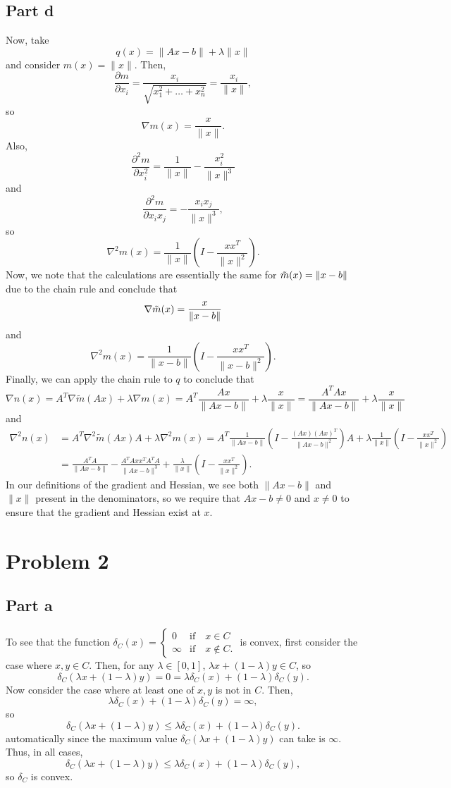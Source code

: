 \documentclass{article}
\begin{document}
\subsection{Part d}
Now, take 
\[
q(x)=\|Ax-b\| + \lambda \|x\|
\]
and consider $m(x)=\|x\|$. Then,
\[
\frac{\partial m}{\partial x_i}=\frac{x_i}{\sqrt{x_1^2+\ldots+x_n^2}}=\frac{x_i}{\|x\|},
\]
so 
\[
\nabla m(x)=\frac{x}{\|x\|}. 
\]
Also,
\[
\frac{\partial^2 m}{\partial x_i^2}=\frac{1}{\|x\|}-\frac{x_i^2}{\|x\|^3}
\]
and
\[
\frac{\partial^2 m}{\partial x_ix_j}=-\frac{x_ix_j}{\|x\|^3},
\]
so 
\[
\nabla^2m(x)=\frac{1}{\|x\|}\left(I-\frac{xx^T}{\|x\|^2}\right).
\]
Now, we note that the calculations are essentially the same for $\Tilde{m}(x)=\|x-b\|$ due to the chain rule and conclude that 
\[
\nabla \Tilde{m}(x)=\frac{x}{\|x-b\|}
\]
and 
\[
\nabla^2m(x)=\frac{1}{\|x-b\|}\left(I-\frac{xx^T}{\|x-b\|^2}\right).
\]
Finally, we can apply the chain rule to $q$ to conclude that
\[
\nabla n(x)=A^T\nabla\tilde{m}(Ax)+\lambda\nabla m(x)=A^T\frac{Ax}{\|Ax-b\|}+\lambda\frac{x}{\|x\|}=\frac{A^TAx}{\|Ax-b\|}+\lambda\frac{x}{\|x\|}
\]
and 
\begin{align*}
\nabla^2 n(x)&=A^T\nabla^2\tilde{m}(Ax)A+\lambda\nabla^2 m(x)=A^T\frac{1}{\|Ax-b\|}\left(I-\frac{(Ax)(Ax)^T}{\|Ax-b\|^2}\right)A+\lambda\frac{1}{\|x\|}\left(I-\frac{xx^T}{\|x\|^2}\right)\\&=
\frac{A^TA}{\|Ax-b\|}-\frac{A^TAxx^TA^TA}{\|Ax-b\|^3}+\frac{\lambda}{\|x\|}\left(I-\frac{xx^T}{\|x\|^2}\right).
\end{align*}
In our definitions of the gradient and Hessian, we see both $\|Ax-b\|$ and $\|x\|$ present in the denominators, so we require that $Ax-b\neq0$ and $x\neq0$ to ensure that the gradient and Hessian exist at $x$.

\section{Problem 2}
\subsection{Part a}
To see that the function 
\(
\delta_C(x) = \begin{cases} 0 & \mbox{if} \quad x \in C \\ \infty & \mbox{if} \quad x \not \in C. \end{cases}
\)
is convex, first consider the case where $x,y\in C$. Then, for any $\lambda\in[0,1]$, $\lambda x+(1-\lambda)y\in C$, so 
\[
\delta_C(\lambda x+(1-\lambda)y)=0=\lambda\delta_C(x)+(1-\lambda)\delta_C(y).
\]
Now consider the case where at least one of $x,y$ is not in $C$. Then, 
\[
\lambda\delta_C(x)+(1-\lambda)\delta_C(y)=\infty,
\]
so 
\[
\delta_C(\lambda x+(1-\lambda)y)\leq\lambda\delta_C(x)+(1-\lambda)\delta_C(y).
\]
automatically since the maximum value $\delta_C(\lambda x+(1-\lambda)y)$ can take is $\infty$. Thus, in all cases,
\[
\delta_C(\lambda x+(1-\lambda)y)\leq\lambda\delta_C(x)+(1-\lambda)\delta_C(y),
\]
so $\delta_C$ is convex.
\end{document}
